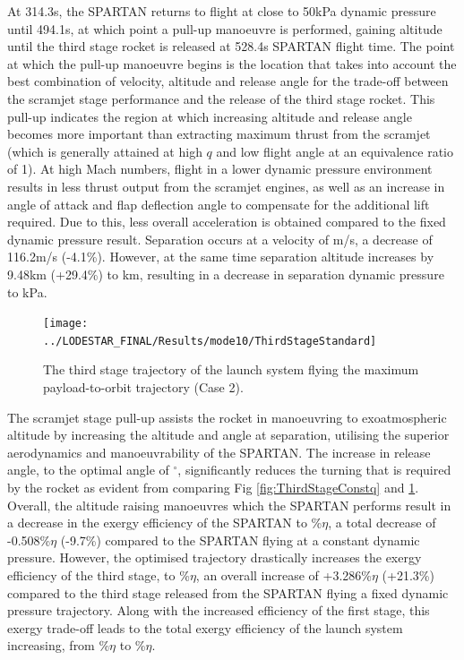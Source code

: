 At 314.3s, the SPARTAN returns to flight at close to 50kPa dynamic pressure until 494.1s, at which point a pull-up manoeuvre is performed, gaining altitude until the third stage rocket is released at 528.4s SPARTAN flight time. 
 The point at which the pull-up manoeuvre begins is the location that takes into account the best combination of velocity, altitude and release angle for the trade-off between the scramjet stage performance and the release of the third stage rocket. This pull-up indicates the region at which increasing altitude and release angle becomes more important than extracting maximum thrust from the scramjet (which is generally attained at high $q$ and low flight angle at an equivalence ratio of 1).
At high Mach numbers, flight in a lower dynamic pressure environment results in less thrust output from the scramjet engines, as well as an increase in angle of attack and flap deflection angle to compensate for the additional lift required. Due to this, less overall acceleration is obtained compared to the fixed dynamic pressure result. Separation occurs at a velocity of \secondthirdSeparationvStandardNoReturn m/s, a decrease of 116.2m/s (-4.1\%). However, at the same time separation altitude increases by 9.48km (+29.4\%) to \secondthirdSeparationAltqStandardNoReturn km, resulting in a decrease in separation dynamic pressure to \secondthirdSeparationqStandardNoReturn kPa. 
\begin{figure}[ht!]
	\centering
	\texttt{[image: ../LODESTAR\_FINAL/Results/mode10/ThirdStageStandard]}
	\caption{The third stage trajectory of the launch system flying the maximum payload-to-orbit trajectory (Case 2).}
	\label{fig:ThirdStageStandardNoReturn}
\end{figure}
The scramjet stage pull-up assists the rocket in manoeuvring to exoatmospheric altitude by increasing the altitude and angle at separation, utilising the superior aerodynamics and manoeuvrability of the SPARTAN. The increase in release angle, to the optimal angle of \secondthirdSeparationgammaStandardNoReturn$^\circ$, significantly reduces the turning that is required by the rocket as evident from comparing Fig \ref{fig:ThirdStageConstq} and \ref{fig:ThirdStageStandardNoReturn}. 
Overall, the altitude raising manoeuvres which the SPARTAN performs result in a decrease in the exergy efficiency of the SPARTAN to \secondExergyEffStandardNoReturn\%$\eta$, a total decrease of -0.508\%$\eta$ (-9.7\%) compared to the SPARTAN flying at a constant dynamic pressure. However, the optimised trajectory drastically increases the exergy efficiency of the third stage, to \thirddExergyEffStandardNoReturn\%$\eta$, an overall increase of +3.286\%$\eta$ (+21.3\%) compared to the third stage released from the SPARTAN flying a fixed dynamic pressure trajectory.  
Along with the increased efficiency of the first stage, this exergy trade-off leads to the total exergy efficiency of the launch system increasing, from \totalExergyEffConstqNoReturn\%$\eta$ to \totalExergyEffStandardNoReturn\%$\eta$. 

